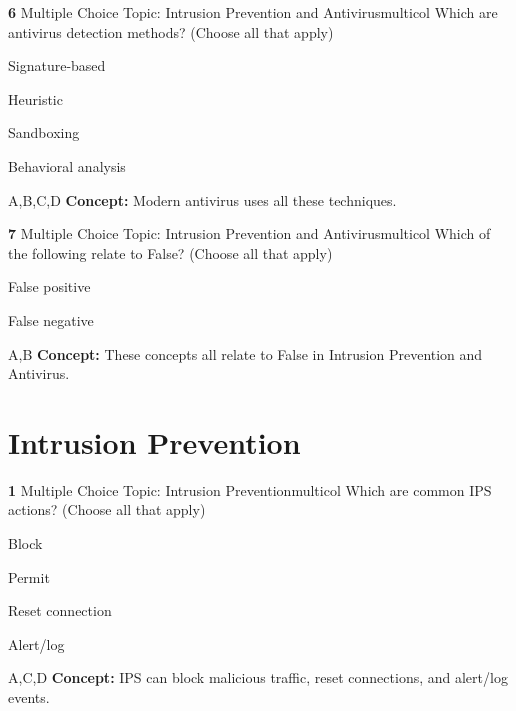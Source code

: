 \documentclass[10pt,a4paper]{article}
\begin{document}
\begin{qcard}{\color{white}\textbf{6} \hfill \small Multiple Choice \textbar{} Topic: Intrusion Prevention and Antivirus}{multicol}
Which are antivirus detection methods? (Choose all that apply)

\begin{qoptions}
\item Signature-based
\item Heuristic
\item Sandboxing
\item Behavioral analysis
\end{qoptions}
\begin{explainbox}{A,B,C,D}
\textbf{Concept:} Modern antivirus uses all these techniques.
\end{explainbox}
\end{qcard}

\begin{qcard}{\color{white}\textbf{7} \hfill \small Multiple Choice \textbar{} Topic: Intrusion Prevention and Antivirus}{multicol}
Which of the following relate to False? (Choose all that apply)

\begin{qoptions}
\item False positive
\item False negative
\end{qoptions}
\begin{explainbox}{A,B}
\textbf{Concept:} These concepts all relate to False in Intrusion Prevention and Antivirus.
\end{explainbox}
\end{qcard}

\section{Intrusion Prevention}
\begin{qcard}{\color{white}\textbf{1} \hfill \small Multiple Choice \textbar{} Topic: Intrusion Prevention}{multicol}
Which are common IPS actions? (Choose all that apply)

\begin{qoptions}
\item Block
\item Permit
\item Reset connection
\item Alert/log
\end{qoptions}
\begin{explainbox}{A,C,D}
\textbf{Concept:} IPS can block malicious traffic, reset connections, and alert/log events.
\end{explainbox}
\end{qcard}
\end{document}
